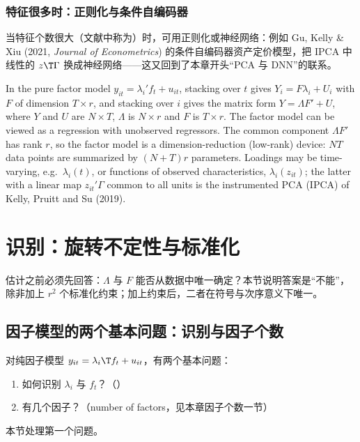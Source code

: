 \subsubsection{特征很多时：正则化与条件自编码器}

当特征个数很大（文献中称为）时，可用正则化或神经网络：例如 Gu, Kelly \& Xiu (2021, \emph{Journal of Econometrics}) 的条件自编码器资产定价模型，把 IPCA 中线性的 $z\T\Gamma$ 换成神经网络——这又回到了本章开头“PCA 与 DNN”的联系。

\begin{english}
In the pure factor model $y_{it}=\lambda_i'f_t+u_{it}$, stacking over $t$ gives $Y_i=F\lambda_i+U_i$ with $F$ of dimension $T\times r$, and stacking over $i$ gives the matrix form $Y=\Lambda F'+U$, where $Y$ and $U$ are $N\times T$, $\Lambda$ is $N\times r$ and $F$ is $T\times r$. The factor model can be viewed as a regression with unobserved regressors. The common component $\Lambda F'$ has rank $r$, so the factor model is a dimension-reduction (low-rank) device: $NT$ data points are summarized by $(N+T)r$ parameters. Loadings may be time-varying, e.g.\ $\lambda_i(t)$, or functions of observed characteristics, $\lambda_i(z_{it})$; the latter with a linear map $z_{it}'\Gamma$ common to all units is the instrumented PCA (IPCA) of Kelly, Pruitt and Su (2019).
\end{english}

\section{识别：旋转不定性与标准化}\label{sec:U13a-ident}

估计之前必须先回答：$\Lambda$ 与 $F$ 能否从数据中唯一确定？本节说明答案是“不能”，除非加上 $r^2$ 个标准化约束；加上约束后，二者在符号与次序意义下唯一。

\subsection{因子模型的两个基本问题：识别与因子个数}

对纯因子模型 $y_{it}=\lambda_i\T f_t+u_{it}$，有两个基本问题：
\begin{enumerate}
\item 如何识别 $\lambda_i$ 与 $f_t$？（）
\item 有几个因子？（number of factors，见本章因子个数一节）
\end{enumerate}
本节处理第一个问题。

